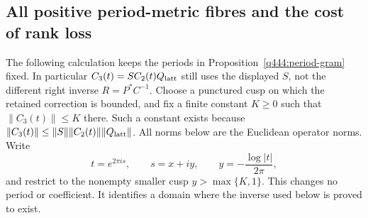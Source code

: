 
\subsection*{All positive period-metric fibres and the cost of rank loss}

The following calculation keeps the periods in
Proposition~\ref{q444:period-gram} fixed.  In particular
$C_3(t)=SC_2(t)Q_{\rm latt}$ still uses the displayed $S$, not the
different right inverse $R=P^*C^{-1}$.  Choose a punctured cusp on which
the retained correction is bounded, and fix a finite constant $K\geq0$
such that $\|C_3(t)\|\leq K$ there.  Such a constant exists because
$\|C_3(t)\|\leq\|S\|\|C_2(t)\|\|Q_{\rm latt}\|$.
All norms below are the Euclidean operator norms.  Write
\[
 t=e^{2\pi i s},\qquad s=x+iy,\qquad
 y=-\frac{\log|t|}{2\pi},
\]
and restrict to the nonempty smaller cusp $y>\max\{K,1\}$.
This changes no period or coefficient.  It identifies a domain where
the inverse used below is proved to exist.

